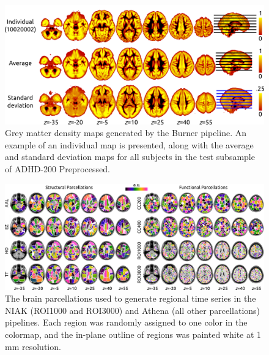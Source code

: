 \documentclass[preprint,12pt,3p]{elsarticle}
\begin{document}


\begin{figure}[!t]
\begin{center}
  \includegraphics[width=0.6\linewidth]{fig_burner}
  \caption{Grey matter density maps generated by the Burner pipeline. An example of an individual map is presented, along with the average and standard deviation maps for all subjects in the test subsample of ADHD-200 Preprocessed.}
  \label{fig:burner}
\end{center}
\end{figure}

\begin{figure}[!t]
\begin{center}
  \includegraphics[width=\linewidth]{fig_parcels}
  \caption{The brain parcellations used to generate regional time series in the NIAK (ROI1000 and ROI3000) and Athena (all other parcellations) pipelines. Each region was randomly assigned to one color in the colormap, and the in-plane outline of regions was painted white at 1 mm resolution.}
  \label{fig:parcels}
\end{center}
\end{figure}
\end{document}
